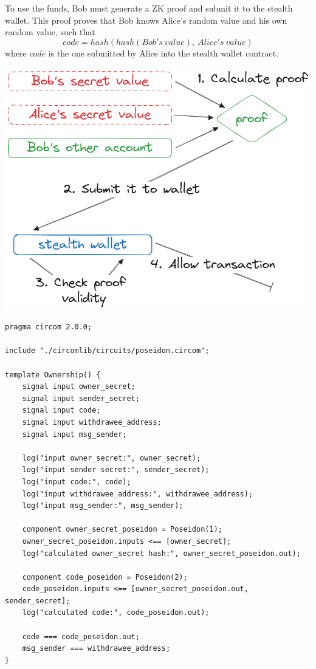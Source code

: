 \documentclass[portrait]{poster}
\begin{document}
\begin{multicols}{2}
    To use the funds, Bob must generate a ZK proof and submit it to the stealth
    wallet. This proof proves that Bob knows Alice's random value
    and his own random value, such that
    \[ code = hash(hash(Bob's\:value),\:Alice's\:value) \]
    where $code$ is the one submitted by Alice into the stealth wallet contract.

    \begin{center}\vspace{1cm}
        \centering
        \includegraphics[width=0.5\linewidth]{../iitsrc/assets/images/interating-with-wallet.png}
        \label{fig:wallet-interaction}
    \end{center}\vspace{1cm}

    \begin{verbatim}
pragma circom 2.0.0;

include "./circomlib/circuits/poseidon.circom";

template Ownership() {
    signal input owner_secret;
    signal input sender_secret;
    signal input code;
    signal input withdrawee_address;
    signal input msg_sender;

    log("input owner_secret:", owner_secret);
    log("input sender secret:", sender_secret);
    log("input code:", code);
    log("input withdrawee_address:", withdrawee_address);
    log("input msg_sender:", msg_sender);

    component owner_secret_poseidon = Poseidon(1);
    owner_secret_poseidon.inputs <== [owner_secret];
    log("calculated owner_secret hash:", owner_secret_poseidon.out);

    component code_poseidon = Poseidon(2);
    code_poseidon.inputs <== [owner_secret_poseidon.out, sender_secret];
    log("calculated code:", code_poseidon.out);

    code === code_poseidon.out;
    msg_sender === withdrawee_address;
}


\end{verbatim}
\end{multicols}
\end{document}
